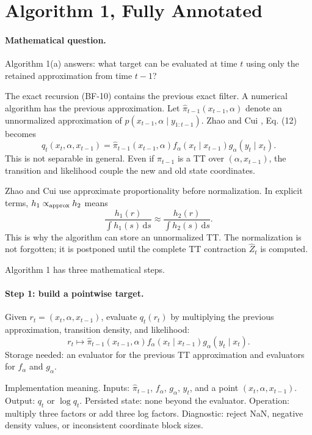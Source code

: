 \documentclass[11pt]{article}
\newcommand{\dd}{\,\mathrm d}
\begin{document}
\section{Algorithm 1, Fully Annotated}

\paragraph{Mathematical question.}
Algorithm 1(a) answers: what target can be evaluated at time \(t\) using only
the retained approximation from time \(t-1\)?

The exact recursion (BF-10) contains the previous exact filter.  A numerical
algorithm has the previous approximation.  Let
\(\widehat\pi_{t-1}(x_{t-1},\alpha)\) denote an unnormalized approximation of
\(p(x_{t-1},\alpha\mid y_{1:t-1})\).  Zhao and Cui \cite{zhao2024ttsequential}, Eq. (12) becomes
\[
    q_t(x_t,\alpha,x_{t-1})
    =
    \widehat\pi_{t-1}(x_{t-1},\alpha)
    f_\alpha(x_t\mid x_{t-1})
    g_\alpha(y_t\mid x_t).
    \label{eq:p24-a1-1}
\]
This is not separable in general.  Even if
\(\widehat\pi_{t-1}\) is a TT over \((\alpha,x_{t-1})\), the transition and
likelihood couple the new and old state coordinates.

Zhao and Cui \cite{zhao2024ttsequential} use approximate proportionality before normalization.  In explicit
terms, \(h_1\propto_{\rm approx} h_2\) means
\[
    \frac{h_1(r)}{\int h_1(s)\dd s}
    \approx
    \frac{h_2(r)}{\int h_2(s)\dd s}.
    \label{eq:p24-a1-0}
\]
This is why the algorithm can store an unnormalized TT.  The normalization is
not forgotten; it is postponed until the complete TT contraction
\(\widehat Z_t\) is computed.

Algorithm 1 has three mathematical steps.

\paragraph{Step 1: build a pointwise target.}
Given \(r_t=(x_t,\alpha,x_{t-1})\), evaluate \(q_t(r_t)\) by multiplying the
previous approximation, transition density, and likelihood:
\[
    r_t\mapsto
    \widehat\pi_{t-1}(x_{t-1},\alpha)
    f_\alpha(x_t\mid x_{t-1})
    g_\alpha(y_t\mid x_t).
\]
Storage needed: an evaluator for the previous TT approximation and evaluators
for \(f_\alpha\) and \(g_\alpha\).

Implementation meaning. Inputs:
\(\widehat\pi_{t-1}\), \(f_\alpha\), \(g_\alpha\), \(y_t\), and a point
\((x_t,\alpha,x_{t-1})\).  Output: \(q_t\) or \(\log q_t\).  Persisted state:
none beyond the evaluator.  Operation: multiply three factors or add three log
factors.  Diagnostic: reject NaN, negative density values, or inconsistent
coordinate block sizes.
\end{document}
